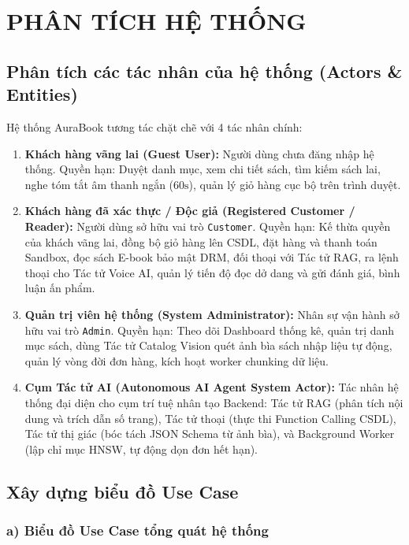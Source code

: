 \documentclass[11pt, a4paper]{report}
\begin{document}
\section{PHÂN TÍCH HỆ THỐNG}

\subsection{Phân tích các tác nhân của hệ thống (Actors \& Entities)}

Hệ thống AuraBook tương tác chặt chẽ với 4 tác nhân chính:
\begin{enumerate}
    \item \textbf{Khách hàng vãng lai (Guest User):} Người dùng chưa đăng nhập hệ thống. Quyền hạn: Duyệt danh mục, xem chi tiết sách, tìm kiếm sách lai, nghe tóm tắt âm thanh ngắn ($60\text{s}$), quản lý giỏ hàng cục bộ trên trình duyệt.
    \item \textbf{Khách hàng đã xác thực / Độc giả (Registered Customer / Reader):} Người dùng sở hữu vai trò \texttt{Customer}. Quyền hạn: Kế thừa quyền của khách vãng lai, đồng bộ giỏ hàng lên CSDL, đặt hàng và thanh toán Sandbox, đọc sách E-book bảo mật DRM, đối thoại với Tác tử RAG, ra lệnh thoại cho Tác tử Voice AI, quản lý tiến độ đọc dở dang và gửi đánh giá, bình luận ấn phẩm.
    \item \textbf{Quản trị viên hệ thống (System Administrator):} Nhân sự vận hành sở hữu vai trò \texttt{Admin}. Quyền hạn: Theo dõi Dashboard thống kê, quản trị danh mục sách, dùng Tác tử Catalog Vision quét ảnh bìa sách nhập liệu tự động, quản lý vòng đời đơn hàng, kích hoạt worker chunking dữ liệu.
    \item \textbf{Cụm Tác tử AI (Autonomous AI Agent System Actor):} Tác nhân hệ thống đại diện cho cụm trí tuệ nhân tạo Backend: Tác tử RAG (phân tích nội dung và trích dẫn số trang), Tác tử thoại (thực thi Function Calling CSDL), Tác tử thị giác (bóc tách JSON Schema từ ảnh bìa), và Background Worker (lập chỉ mục HNSW, tự động dọn đơn hết hạn).
\end{enumerate}

\subsection{Xây dựng biểu đồ Use Case}

\subsubsection{a) Biểu đồ Use Case tổng quát hệ thống}
\end{document}
